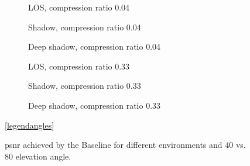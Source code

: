 \documentclass[conference]{IEEEtran}
\newcommand\baseline{Baseline\xspace}
\begin{document}
\begin{figure}[t!]
  \begin{subfigure}{.32\linewidth}
  \centering
  
  \caption{LOS, compression ratio 0.04}
  \label{subfig:base4080_los_04}
\end{subfigure}
\hfill
\begin{subfigure}{.32\linewidth}
  \centering
  
  \caption{Shadow, compression ratio 0.04}
  \label{subfig:base4080_shadow_04}
\end{subfigure}
\hfill
\begin{subfigure}{.32\linewidth}
  \centering
  
  \caption{Deep shadow, compression ratio 0.04}
  \label{subfig:base4080_deep_shadow_04}
\end{subfigure}

\vspace{1em}

\begin{subfigure}{.32\linewidth}
  \centering
  
  \caption{LOS, compression ratio 0.33}
  \label{subfig:base4080_los_33}
\end{subfigure}
\hfill
\begin{subfigure}{.32\linewidth}
  \centering
  
  \caption{Shadow, compression ratio 0.33}
  \label{subfig:base4080_shadow_33}
\end{subfigure}
\hfill
\begin{subfigure}{.32\linewidth}
  \centering
  
  \caption{Deep shadow, compression ratio 0.33}
  \label{subfig:base4080_deep_shadow_33}
\end{subfigure}

\vspace{1em}
\centering
\ref{legendangles}

\caption{\ac{psnr} achieved by the \baseline for different environments and 40\textdegree{} vs. 80\textdegree{} elevation angle.}
\label{fig:elevation_angles}
\end{figure}
\end{document}
